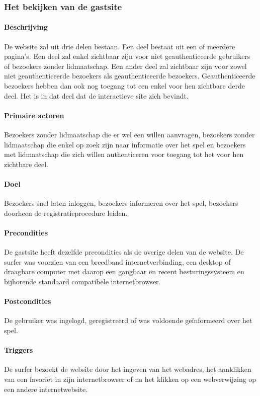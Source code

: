 \subsubsection{Het bekijken van de gastsite}
\begin{compact}
\paragraph{Beschrijving}De website zal uit drie delen bestaan. Een deel bestaat uit een of meerdere pagina's. Een deel zal enkel zichtbaar zijn voor niet geauthenticeerde gebruikers of bezoekers zonder lidmaatschap. Een ander deel zal zichtbaar zijn voor zowel niet geauthenticeerde bezoekers als geauthenticeerde bezoekers. Geauthenticeerde bezoekers hebben dan ook nog toegang tot een enkel voor hen zichtbare derde deel. Het is in dat deel dat de interactieve site zich bevindt.
\paragraph{Primaire actoren} Bezoekers zonder lidmaatschap die er wel een willen aanvragen, bezoekers zonder lidmaatschap die enkel op zoek zijn naar informatie over het spel en bezoekers met lidmaatschap die zich willen authenticeren voor toegang tot het voor hen zichtbare deel.
\paragraph{Doel} Bezoekers snel laten inloggen, bezoekers informeren over het spel, bezoekers doorheen de registratieprocedure leiden.
\paragraph{Precondities} De gastsite heeft dezelfde precondities als de overige delen van de website. De surfer was voorzien van een breedband internetverbinding, een desktop of draagbare computer met daarop een gangbaar en recent besturingssysteem en bijhorende standaard compatibele internetbrowser.
\paragraph{Postcondities} De gebruiker was ingelogd, geregistreerd of was voldoende ge\"informeerd over het spel.
\paragraph{Triggers} De surfer bezoekt de website door het ingeven van het webadres, het aanklikken van een favoriet in zijn internetbrowser of na het klikken op een webverwijzing op een andere internetwebsite.

\end{compact}
